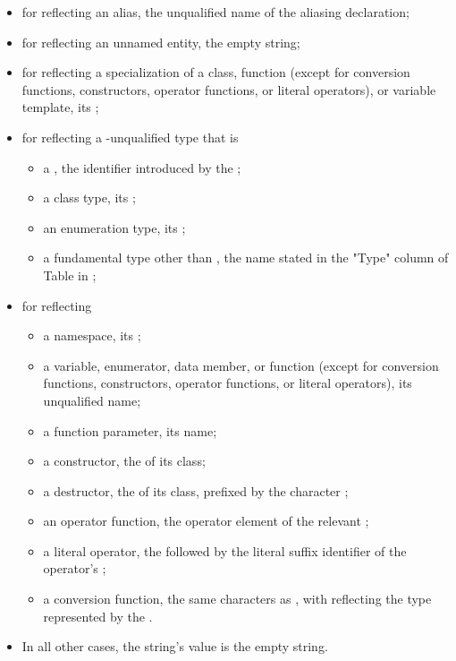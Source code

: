 \begin{std.txt}
\begin{itemdescr}
\begin{itemize}
\item for  reflecting an alias, the unqualified name of the aliasing declaration;
\item for  reflecting an unnamed entity, the empty string;
\item for  reflecting a specialization of a class, function (except for conversion functions, constructors, operator functions, or literal operators), or variable template, its ;
\item for  reflecting a \cv-unqualified type that is
    \begin{itemize}
    \item a , the identifier introduced by the ;
    \item a class type, its ;
    \item an enumeration type, its ;
    \item a fundamental type other than , the name stated in the "Type" column of Table  in ;
    \end{itemize}
\item for  reflecting
    \begin{itemize}
    \item a namespace, its ;
    \item a variable, enumerator, data member, or function (except for conversion functions, constructors, operator functions, or literal operators), its unqualified name;
    \item a function parameter, its name;
    \item a constructor, the  of its class;
    \item a destructor, the  of its class, prefixed by the character ;
    \item an operator function, the operator element of the relevant ;
    \item a literal operator, the   followed by the literal suffix identifier of the operator's ;
    \item a conversion function, the same characters as , with  reflecting the type represented by the .
    \end{itemize}
\item In all other cases, the string’s value is the empty string.
\end{itemize}


\end{itemdescr}
\end{std.txt}
